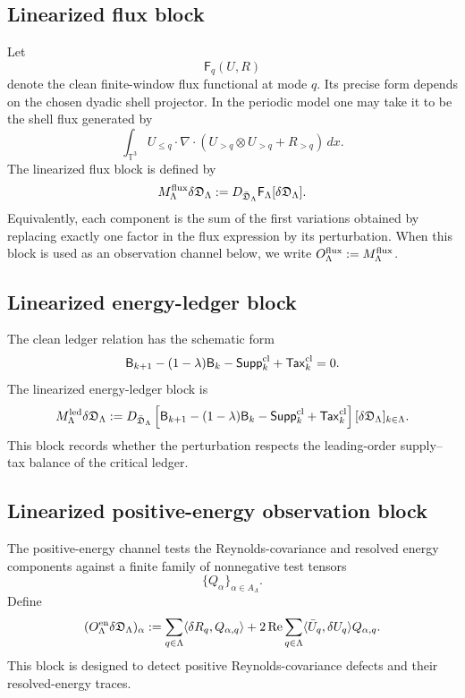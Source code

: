 \documentclass[11pt]{article}
\numberwithin{equation}{section}
\begin{document}
\subsection{Linearized flux block}

Let
\[
        \mathsf F_q(U,R)
\]
denote the clean finite-window flux functional at mode \(q\).  Its precise
form depends on the chosen dyadic shell projector.  In the periodic model
one may take it to be the shell flux generated by
\[
        \int_{\mathbb T^3}
        U_{\le q}\cdot\nabla\cdot(U_{>q}\otimes U_{>q}+R_{>q})
        \,dx .
\]
The linearized flux block is defined by
\[
        M_\Lambda^{\rm flux}\delta\mathfrak D_\Lambda
        :=
        D_{\bar{\mathfrak D}_\Lambda}\mathsf F_\Lambda
        [\delta\mathfrak D_\Lambda].
\]
Equivalently, each component is the sum of the first variations obtained by
replacing exactly one factor in the flux expression by its perturbation.  When
this block is used as an observation channel below, we write
\(O_\Lambda^{\rm flux}:=M_\Lambda^{\rm flux}\).

\subsection{Linearized energy-ledger block}

The clean ledger relation has the schematic form
\[
        \mathsf B_{k+1}
        -
        (1-\lambda)\mathsf B_k
        -
        \mathsf{Supp}^{\rm cl}_k
        +
        \mathsf{Tax}^{\rm cl}_k
        =
        0.
\]
The linearized energy-ledger block is
\[
        M_\Lambda^{\rm led}\delta\mathfrak D_\Lambda
        :=
        D_{\bar{\mathfrak D}_\Lambda}
        \left[
        \mathsf B_{k+1}
        -
        (1-\lambda)\mathsf B_k
        -
        \mathsf{Supp}^{\rm cl}_k
        +
        \mathsf{Tax}^{\rm cl}_k
        \right]
        [\delta\mathfrak D_\Lambda]_{k\in\Lambda}.
\]
This block records whether the perturbation respects the leading-order
supply--tax balance of the critical ledger.

\subsection{Linearized positive-energy observation block}

The positive-energy channel tests the Reynolds-covariance and resolved
energy components against a finite family of nonnegative test tensors
\[
        \{Q_\alpha\}_{\alpha\in A_\Lambda}.
\]
Define
\[
        (O_\Lambda^{\rm en}\delta\mathfrak D_\Lambda)_\alpha
        :=
        \sum_{q\in\Lambda}
        \langle \delta R_q,Q_{\alpha,q}\rangle
        +
        2\operatorname{Re}
        \sum_{q\in\Lambda}
        \langle \bar U_q,\delta U_q\rangle Q_{\alpha,q}.
\]
This block is designed to detect positive Reynolds-covariance defects and
their resolved-energy traces.
\end{document}
